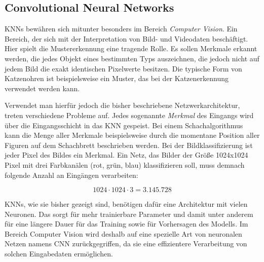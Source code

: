 
\subsection{Convolutional Neural Networks}
\acp{KNN} bewähren sich mitunter besonders im Bereich \emph{Computer Vision}. Ein Bereich, der sich mit der Interpretation von Bild- und Videodaten beschäftigt. Hier spielt die Mustererkennung eine tragende Rolle. Es sollen Merkmale erkannt werden, die jedes Objekt eines bestimmten Typs auszeichnen, die jedoch nicht auf jedem Bild die exakt identischen Pixelwerte besitzen. Die typische Form von Katzenohren ist beispielsweise ein Muster, das bei der Katzenerkennung verwendet werden kann. \cite{knnsKompakt}

Verwendet man hierfür jedoch die bisher beschriebene Netzwerkarchitektur, treten verschiedene Probleme auf. Jedes sogenannte \emph{Merkmal} des Eingangs wird über die Eingangsschicht in das \ac{KNN} gespeist. Bei einem Schachalgorithmus kann die Menge aller Merkmale beispielsweise durch die momentane Position aller Figuren auf dem Schachbrett beschrieben werden. Bei der Bildklassifizierung ist jeder Pixel des Bildes ein Merkmal. Ein Netz, das Bilder der Größe 1024x1024 Pixel mit drei Farbkanälen (rot, grün, blau) klassifizieren soll, muss demnach folgende Anzahl an Eingängen verarbeiten: \cite{knnsKompakt}

\begin{equation}
   1024 \cdot 1024 \cdot 3 = 3.145.728
\end{equation}

\acp{KNN}, wie sie bisher gezeigt sind, benötigen dafür eine Architektur mit vielen Neuronen. Das sorgt für mehr trainierbare Parameter und damit unter anderem für eine längere Dauer für das Training sowie für Vorhersagen des Modells. Im Bereich Computer Vision wird deshalb auf eine spezielle Art von neuronalen Netzen namens \ac{CNN} zurückgegriffen, da sie eine effizientere Verarbeitung von solchen Eingabedaten ermöglichen. \cite{knnsKompakt} 

